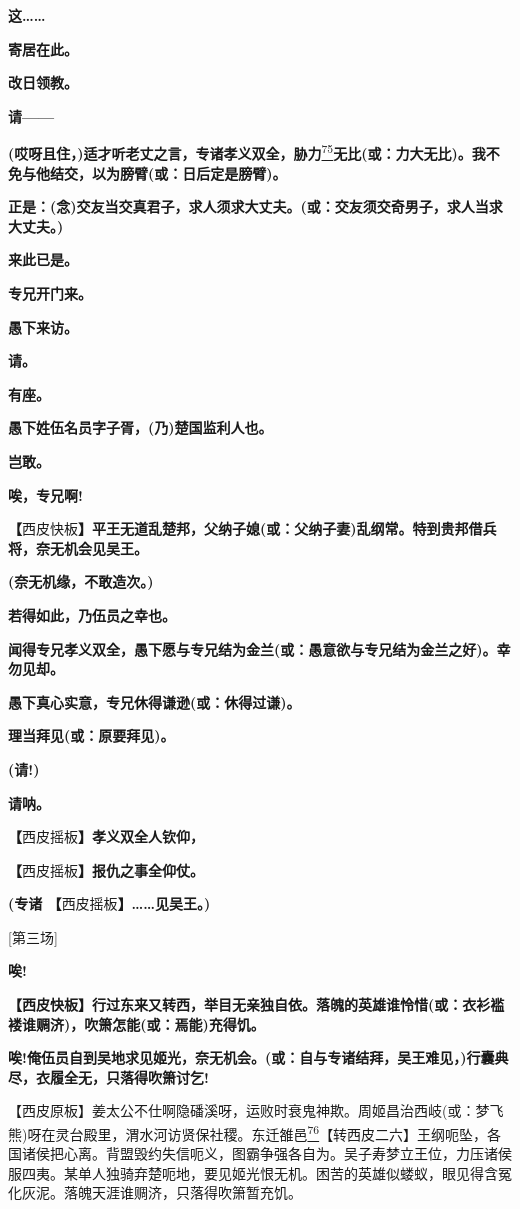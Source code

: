 \textbf{这\ldots{}\ldots{}}

\textbf{寄居在此。}

\textbf{改日领教。}

\textbf{请------}

\textbf{(哎呀且住，)适才听老丈之言，专诸孝义双全，胁力}\protect\hyperlink{fn75}{\textsuperscript{75}}\textbf{无比(或：力大无比)。我不免与他结交，以为膀臂(或：日后定是膀臂)。}

\textbf{正是：(念)交友当交真君子，求人须求大丈夫。(或：交友须交奇男子，求人当求大丈夫。)}

\textbf{来此已是。}

\textbf{专兄开门来。}

\textbf{愚下来访。}

\textbf{请。}

\textbf{有座。}

\textbf{愚下姓伍名员字子胥，(乃)楚国监利人也。}

\textbf{岂敢。}

\textbf{唉，专兄啊!}

\textbf{【}西皮快板\textbf{】平王无道乱楚邦，父纳子媳(或：父纳子妻)乱纲常。特到贵邦借兵将，奈无机会见吴王。}

\textbf{(奈无机缘，不敢造次。)}

\textbf{若得如此，乃伍员之幸也。}

\textbf{闻得专兄孝义双全，愚下愿与专兄结为金兰(或：愚意欲与专兄结为金兰之好)。幸勿见却。}

\textbf{愚下真心实意，专兄休得谦逊(或：休得过谦)。}

\textbf{理当拜见(或：原要拜见)。}

\textbf{(请!)}

\textbf{请呐。}

\textbf{【}西皮摇板\textbf{】孝义双全人钦仰，}

\textbf{【}西皮摇板\textbf{】报仇之事全仰仗。}

\textbf{(专诸 【}西皮摇板\textbf{】\ldots{}\ldots{}见吴王。)}

{[}第三场{]}

\textbf{唉!}

\textbf{【西皮快板】行过东来又转西，举目无亲独自依。落魄的英雄谁怜惜(或：衣衫褴褛谁赒济)，吹箫怎能(或：焉能)充得饥。}

\textbf{唉!俺伍员自到吴地求见姬光，奈无机会。(或：自与专诸结拜，吴王难见，)行囊典尽，衣履全无，只落得吹箫讨乞!}

【西皮原板】姜太公不仕啊隐磻溪呀，运败时衰鬼神欺。周姬昌治西岐(或：梦飞熊)呀在灵台殿里，渭水河访贤保社稷。东迁雒邑\protect\hyperlink{fn76}{\textsuperscript{76}}【转西皮二六】王纲呃坠，各国诸侯把心离。背盟毁约失信呃义，图霸争强各自为。吴子寿梦立王位，力压诸侯服四夷。某单人独骑弃楚呃地，要见姬光恨无机。困苦的英雄似蝼蚁，眼见得含冤化灰泥。落魄天涯谁赒济，只落得吹箫暂充饥。

